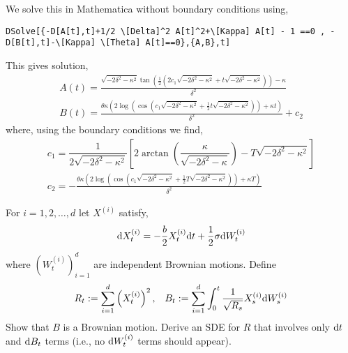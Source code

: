 \documentclass[10pt]{article}
\begin{document}
\begin{solution}[Solution]
We solve this in Mathematica without boundary conditions using,
\begin{lstlisting}
DSolve[{-D[A[t],t]+1/2 \[Delta]^2 A[t]^2+\[Kappa] A[t] - 1 ==0 , -D[B[t],t]-\[Kappa] \[Theta] A[t]==0},{A,B},t]
\end{lstlisting}

This gives solution,
\begin{align*}
    A(t) = \frac{\sqrt{-2 \delta ^2-\kappa ^2} \tan \left(\frac{1}{2} \left(2 c_1 \sqrt{-2 \delta ^2-\kappa ^2}+t \sqrt{-2 \delta ^2-\kappa ^2}\right)\right)-\kappa }{\delta ^2} \\
    B(t) = \frac{\theta  \kappa  \left(2 \log \left(\cos \left(c_1 \sqrt{-2 \delta ^2-\kappa ^2}+\frac{1}{2} t \sqrt{-2 \delta ^2-\kappa ^2}\right)\right)+\kappa  t\right)}{\delta ^2}+c_2
\end{align*}
where, using the boundary conditions we find,
\begin{align*}
    c_1 = \dfrac{1}{2\sqrt{-2\delta^2-\kappa^2}} \left[ 2\arctan\left(\dfrac{\kappa}{\sqrt{-2\delta^2-\kappa}} \right) - T\sqrt{-2\delta^2-\kappa^2} \right] \\
    c_2 =  -\frac{\theta  \kappa  \left(2 \log \left(\cos \left(c_1 \sqrt{-2 \delta ^2-\kappa ^2}+\frac{1}{2} T \sqrt{-2 \delta ^2-\kappa ^2}\right)\right)+\kappa  T\right)}{\delta ^2}
\end{align*}
\end{solution}


\begin{problem}[Exercise 9.3]
For \( i=1,2, \ldots, d \) let \( X^{(i)} \) satisfy,
    \begin{align*}
        \mathrm{d} X_t^{(i)} = -\dfrac{b}{2} X_t^{(i)} \mathrm{d} t + \dfrac{1}{2}\sigma\mathrm{d} W_t^{(i)}
    \end{align*}
    where \( (W_t^{(i)})_{i=1}^{d} \) are independent Brownian motions. Define
    \begin{align*}
        R_t := \sum_{i=1}^{d} \left(X_t^{(i)}\right)^2, && B_t := \sum_{i=1}^{d} \int_{0}^{t} \dfrac{1}{\sqrt{R_s}}X_s^{(i)} \mathrm{d} W_s^{(i)}
    \end{align*}
    Show that \( B \) is a Brownian motion. Derive an SDE for \( R \) that involves only \( \mathrm{d} t \) and \( \mathrm{d} B_t \) terms (i.e., no \( \mathrm{d} W_t^{(i)} \) terms should appear).
\end{problem}
\end{document}
